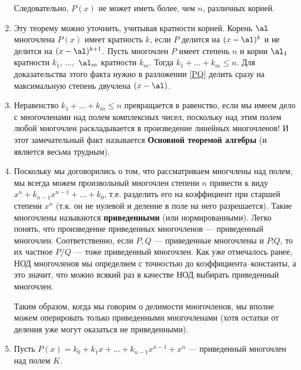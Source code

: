 \begin{enumerate}
Следовательно, $P(x)$ не может иметь более, чем $n$, различных корней.
\epf

\item Эту теорему можно уточнить, учитывая кратности корней. Корень $\al$ многочлена $P(x)$ имеет кратность $k$, если $P$ делится на $(x-\al)^k$ и не делится на $(x-\al)^{k+1}$. Пусть многочлен $P$ имеет степень $n$ и корни $\al_1$ кратности $k_1$, $\dots,$ $\al_m$ кратности $k_m$. Тогда $k_1+\dots+k_m\le n$. Для доказательства этого факта нужно в разложении \eqref{PQ} делить сразу на максимальную степень двучлена $(x-\al)$.
\item Неравенство $k_1+\dots+k_m\le n$ превращается в равенство, если мы имеем дело с многочленами над полем комплексных чисел, поскольку над этим полем любой многочлен раскладывается в произведение линейных многочленов! И этот замечательный факт называется \textbf{Основной теоремой алгебры} (и является весьма трудным).




\item Поскольку мы договорились о том, что рассматриваем многчлены над полем, мы всегда можем произвольный многочлен степени $n$ привести к виду $x^n+k_{n-1}x^{n-1}+\dots+k_0$, т.е. разделить его на коэффициент при старшей степени $x^n$ (т.к. он не нулевой и деление в поле на него разрешается). Такие многочлены называются \textbf{приведенными} (или нормированными). Легко понять, что произведение приведенных многочленов --- приведенный многочлен. Соответственно, если $P,Q$ --- приведенные многочлены и $P\vdots Q$, то их частное $P/Q$ --- тоже приведенный многочлен. Как уже отмечалось ранее, НОД многочленов мы определяем с точностью до коэффициента--константы, а это значит, что можно всякий раз в качестве НОД выбирать приведенный многочлен.

Таким образом, когда мы говорим о делимости многочленов, мы вполне можем оперировать только приведенными многочленами (хотя остатки от деления уже могут оказаться не приведенными).

\item Пусть $P(x)=k_0+k_1x+\dots+k_{n-1}x^{n-1}+x^n$ --- приведенный многочлен над полем $K$.


\end{enumerate}
